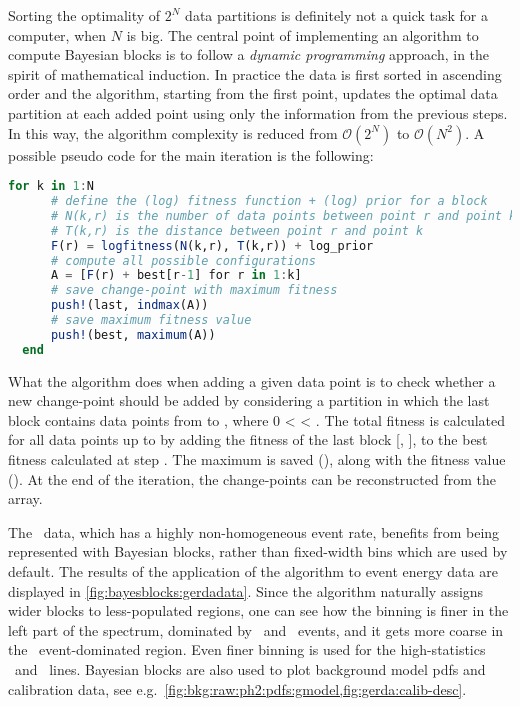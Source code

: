 Sorting the optimality of $2^N$ data partitions is definitely not a quick task for a
computer, when $N$ is big. The central point of implementing an algorithm to compute
Bayesian blocks is to follow a \emph{dynamic programming} approach, in the spirit of
mathematical induction. In practice the data is first sorted in ascending order and the
algorithm, starting from the first point, updates the optimal data partition at each added
point using only the information from the previous steps. In this way, the algorithm
complexity is reduced from $\mathcal{O}(2^N)$ to $\mathcal{O}(N^2)$. A possible pseudo
code for the main iteration is the following:
\begin{lstlisting}[language=julia, style=jlcodestyle]
  for k in 1:N
      # define the (log) fitness function + (log) prior for a block
      # N(k,r) is the number of data points between point r and point k
      # T(k,r) is the distance between point r and point k
      F(r) = logfitness(N(k,r), T(k,r)) + log_prior
      # compute all possible configurations
      A = [F(r) + best[r-1] for r in 1:k]
      # save change-point with maximum fitness
      push!(last, indmax(A))
      # save maximum fitness value
      push!(best, maximum(A))
  end
\end{lstlisting}
What the algorithm does when adding a given data point  is to check whether a new
change-point should be added by considering a partition in which the last block contains
data points from  to , where 0 <  < . The total fitness is calculated
for all data points up to  by adding the fitness of the last block [, ], to
the best fitness calculated at step . The maximum is saved (), along with the
fitness value (). At the end of the iteration, the change-points can be
reconstructed from the  array.

The \gerda\ data, which has a highly non-homogeneous event rate, benefits from being
represented with Bayesian blocks, rather than fixed-width bins which are used by default.
The results of the application of the algorithm to event energy data are displayed in
\cref{fig:bayesblocks:gerdadata}. Since the algorithm naturally assigns wider blocks to
less-populated regions, one can see how the binning is finer in the left part of the
spectrum, dominated by \Arl\ and \nnbb\ events, and it gets more coarse in the \a\
event-dominated region. Even finer binning is used for the high-statistics \kvn\ and \kvz\
lines. Bayesian blocks are also used to plot background model pdfs and calibration data,
see e.g.~\cref{fig:bkg:raw:ph2:pdfs:gmodel,fig:gerda:calib-desc}.

